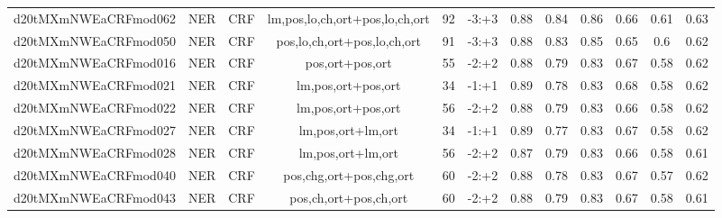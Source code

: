 \documentclass[a4paper]{article}
\begin{document}
\begin{landscape}
\begin{center}
\begin{tabular}{ |c|c|c|c|c|c|c|c|c|c|c|c|}
 		\small{ d20tMXmNWEaCRFmod062 } & NER & CRF & lm,pos,lo,ch,ort+pos,lo,ch,ort  &  92 &  -3:+3  &  0.88 & 0.84 & 0.86  &  0.66 & 0.61 & 0.63 \\
 		

 	
 
 	
 		
 		\small{ d20tMXmNWEaCRFmod050 } & NER & CRF & pos,lo,ch,ort+pos,lo,ch,ort  &  91 &  -3:+3  &  0.88 & 0.83 & 0.85  &  0.65 & 0.6 & 0.62 \\
 		

 	
 
 	
 		
 		\small{ d20tMXmNWEaCRFmod016 } & NER & CRF & pos,ort+pos,ort  &  55 &  -2:+2  &  0.88 & 0.79 & 0.83  &  0.67 & 0.58 & 0.62 \\
 		

 	
 
 	
 		
 		\small{ d20tMXmNWEaCRFmod021 } & NER & CRF & lm,pos,ort+pos,ort  &  34 &  -1:+1  &  0.89 & 0.78 & 0.83  &  0.68 & 0.58 & 0.62 \\
 		

 	
 
 	
 		
 		\small{ d20tMXmNWEaCRFmod022 } & NER & CRF & lm,pos,ort+pos,ort  &  56 &  -2:+2  &  0.88 & 0.79 & 0.83  &  0.66 & 0.58 & 0.62 \\
 		

 	
 
 	
 		
 		\small{ d20tMXmNWEaCRFmod027 } & NER & CRF & lm,pos,ort+lm,ort  &  34 &  -1:+1  &  0.89 & 0.77 & 0.83  &  0.67 & 0.58 & 0.62 \\
 		

 	
 
 	
 		
 		\small{ d20tMXmNWEaCRFmod028 } & NER & CRF & lm,pos,ort+lm,ort  &  56 &  -2:+2  &  0.87 & 0.79 & 0.83  &  0.66 & 0.58 & 0.61 \\
 		

 	
 
 	
 		
 		\small{ d20tMXmNWEaCRFmod040 } & NER & CRF & pos,chg,ort+pos,chg,ort  &  60 &  -2:+2  &  0.88 & 0.78 & 0.83  &  0.67 & 0.57 & 0.62 \\
 		

 	
 
 	
 		
 		\small{ d20tMXmNWEaCRFmod043 } & NER & CRF & pos,ch,ort+pos,ch,ort  &  60 &  -2:+2  &  0.88 & 0.79 & 0.83  &  0.67 & 0.58 & 0.61 \\
 		


\end{tabular}
\end{center}
\end{landscape}
\end{document}
